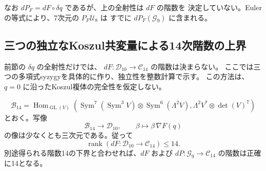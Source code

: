 なお $dP_F=dF\circ\delta q$ であるが、上の全射性は $dF$ の階数を
決定していない。Eulerの等式により、7次元の $P_F\mathcal U_8$ は
すでに $dP_F(\mathcal G_9)$ に含まれる。

\subsection{三つの独立なKoszul共変量による14次階数の上界}
\label{subsec:v11-koszul-three-syzygies}

前節の $\delta q$ の全射性だけでは、
$dF:\mathcal D_{10}\to\mathcal C_{14}$ の階数は決まらない。
ここでは三つの多項式syzygyを具体的に作り、独立性を整数計算で示す。
この方法は、$q=0$ に沿ったKoszul複体の完全性を仮定しない。

\begin{proposition}[独立な三つのKoszul像]
\label{prop:v11-three-koszul-images}
\[
 \mathcal B_{14}=
 \operatorname{Hom}_{\operatorname{GL}(V)}
 \left(\operatorname{Sym}^7(\operatorname{Sym}^3V)
       \otimes\operatorname{Sym}^6(\Lambda^2V),
       \Lambda^2V^*\otimes\det(V)^7\right)
\]
とおく。写像
\[
 \mathcal B_{14}\longrightarrow\mathcal D_{10},
 \qquad \beta\longmapsto\beta\,\nabla F(q)
\]
の像は少なくとも三次元である。従って
\[
 \operatorname{rank}(dF:\mathcal D_{10}\to\mathcal C_{14})\le14.
\]
別途得られる階数14の下界と合わせれば、$dF$ および
$dP:\mathcal G_9\to\mathcal C_{14}$ の階数は正確に14となる。
\end{proposition}
